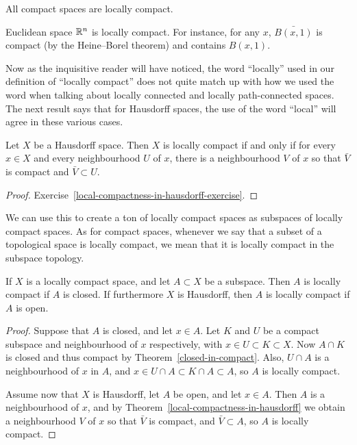 \begin{example}
  All compact spaces are locally compact.
\end{example}
\begin{example}
  Euclidean space $\mathbb{R}^n$ is locally compact. For instance, for any $x$, $\bar{B(x,1)}$ is compact (by the Heine--Borel theorem) and contains $B(x,1)$.
\end{example}
Now as the inquisitive reader will have noticed, the word ``locally'' used in our definition of ``locally compact'' does not quite match up with how we used the word when talking about locally connected and locally path-connected spaces. The next result says that for Hausdorff spaces, the use of the word ``local'' will agree in these various cases.
\begin{thm}
  \label{local-compactness-in-hausdorff}
  Let $X$ be a Hausdorff space. Then $X$ is locally compact if and only if for every $x \in X$ and every neighbourhood $U$ of $x$, there is a neighbourhood $V$ of $x$ so that $\bar{V}$ is compact and $\bar V \subset U$.
\end{thm}
\begin{proof}
  Exercise~\ref{local-compactness-in-hausdorff-exercise}.
\end{proof}
We can use this to create a ton of locally compact spaces as subspaces of locally compact spaces. As for compact spaces, whenever we say that a subset of a topological space is locally compact, we mean that it is locally compact in the subspace topology.
\begin{prop}
  If $X$ is a locally compact space, and let $A \subset X$ be a subspace. Then $A$ is locally compact if $A$ is closed. If furthermore $X$ is Hausdorff, then $A$ is locally compact if $A$ is open.
\end{prop}
\begin{proof}
  Suppose that $A$ is closed, and let $x \in A$. Let $K$ and $U$ be a compact subspace and neighbourhood of $x$ respectively, with $x \in U \subset K \subset X$. Now $A \cap K$ is closed and thus compact by Theorem~\ref{closed-in-compact}. Also, $U \cap A$ is a neighbourhood of $x$ in $A$, and $x \in U \cap A \subset K \cap A \subset A$, so $A$ is locally compact.
  
  Assume now that $X$ is Hausdorff, let $A$ be open, and let $x \in A$. Then $A$ is a neighbourhood of $x$, and by Theorem~\ref{local-compactness-in-hausdorff} we obtain a neighbourhood $V$ of $x$ so that $\bar{V}$ is compact, and $\bar{V} \subset A$, so $A$ is locally compact.
\end{proof}
